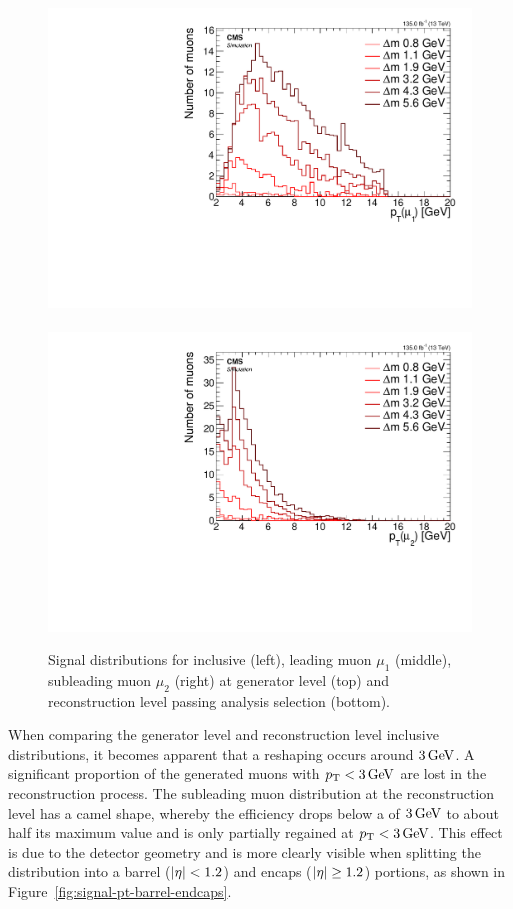\begin{figure}[!htb]
\includegraphics[width=0.32\linewidth]{plots/signal_muons/none_Muons_m1_pt.pdf}  \,
\includegraphics[width=0.32\linewidth]{plots/signal_muons/none_Muons_m2_pt.pdf} \\
\caption[Signal \pt distributions]{ Signal \pt distributions for inclusive (left), leading muon $\mu_1$ (middle),  subleading muon $\mu_2$ (right) at generator level (top) and reconstruction level passing analysis selection (bottom). }
\label{fig:signal-muons-pt}
\end{figure}

When comparing the generator level and reconstruction level inclusive \pt distributions, it becomes apparent that a reshaping occurs around $3 \,\text{Ge\hspace{-.08em}V}$. A significant proportion of the generated muons with $p_{\mathrm{T}}<3\,\text{Ge\hspace{-.08em}V}$ are lost in the reconstruction process. The subleading muon \pt distribution at the reconstruction level has a camel shape, whereby the efficiency drops below a \pt of $3\,\text{Ge\hspace{-.08em}V}$ to about half its maximum value and is only partially regained at $p_{\mathrm{T}}<3\,\text{Ge\hspace{-.08em}V}$. This effect is due to the detector geometry and is more clearly visible when splitting the \pt distribution into a barrel ($\abs{\eta} < 1.2$) and encaps ($\abs{\eta} \geq 1.2$) portions, as shown in Figure~\ref{fig:signal-pt-barrel-endcaps}.

